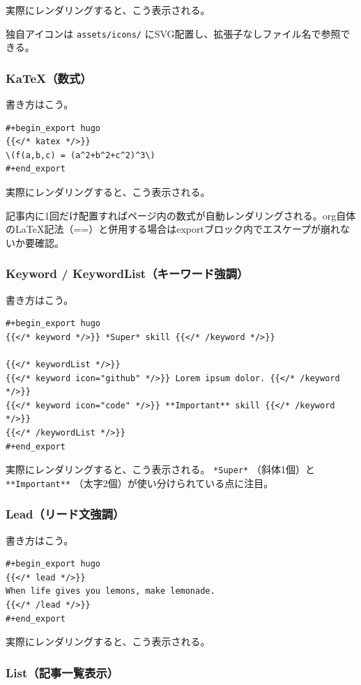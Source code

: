 \documentclass[11pt]{article}
\begin{document}
実際にレンダリングすると、こう表示される。

独自アイコンは \texttt{assets/icons/} にSVG配置し、拡張子なしファイル名で参照できる。
\subsubsection{KaTeX（数式）}
\label{sec:orgea2d807}

書き方はこう。

\begin{verbatim}
#+begin_export hugo
{{</* katex */>}}
\(f(a,b,c) = (a^2+b^2+c^2)^3\)
#+end_export
\end{verbatim}

実際にレンダリングすると、こう表示される。

記事内に1回だけ配置すればページ内の数式が自動レンダリングされる。org自体の\LaTeX{}記法（==）と併用する場合はexportブロック内でエスケープが崩れないか要確認。
\subsubsection{Keyword / KeywordList（キーワード強調）}
\label{sec:org5100b85}

書き方はこう。

\begin{verbatim}
#+begin_export hugo
{{</* keyword */>}} *Super* skill {{</* /keyword */>}}

{{</* keywordList */>}}
{{</* keyword icon="github" */>}} Lorem ipsum dolor. {{</* /keyword */>}}
{{</* keyword icon="code" */>}} **Important** skill {{</* /keyword */>}}
{{</* /keywordList */>}}
#+end_export
\end{verbatim}

実際にレンダリングすると、こう表示される。 \texttt{*Super*} （斜体1個）と \texttt{**Important**} （太字2個）が使い分けられている点に注目。
\subsubsection{Lead（リード文強調）}
\label{sec:org9757613}

書き方はこう。

\begin{verbatim}
#+begin_export hugo
{{</* lead */>}}
When life gives you lemons, make lemonade.
{{</* /lead */>}}
#+end_export
\end{verbatim}

実際にレンダリングすると、こう表示される。
\subsubsection{List（記事一覧表示）}
\label{sec:org96b88fb}
\end{document}
